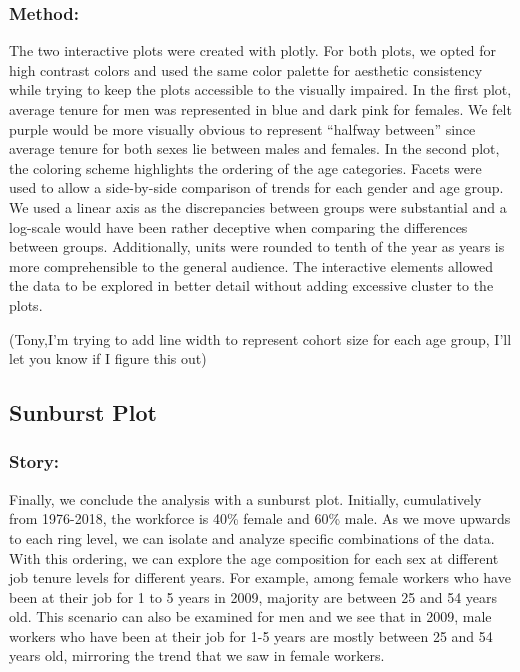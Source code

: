 \documentclass[]{article}
\begin{document}
\hypertarget{method-1}{%
\subsubsection{Method:}\label{method-1}}

The two interactive plots were created with plotly. For both plots, we
opted for high contrast colors and used the same color palette for
aesthetic consistency while trying to keep the plots accessible to the
visually impaired. In the first plot, average tenure for men was
represented in blue and dark pink for females. We felt purple would be
more visually obvious to represent ``halfway between'' since average
tenure for both sexes lie between males and females. In the second plot,
the coloring scheme highlights the ordering of the age categories.
Facets were used to allow a side-by-side comparison of trends for each
gender and age group. We used a linear axis as the discrepancies between
groups were substantial and a log-scale would have been rather deceptive
when comparing the differences between groups. Additionally, units were
rounded to tenth of the year as years is more comprehensible to the
general audience. The interactive elements allowed the data to be
explored in better detail without adding excessive cluster to the plots.

(Tony,I'm trying to add line width to represent cohort size for each age
group, I'll let you know if I figure this out)

\hypertarget{sunburst-plot}{%
\subsection{Sunburst Plot}\label{sunburst-plot}}

\hypertarget{story-2}{%
\subsubsection{Story:}\label{story-2}}

Finally, we conclude the analysis with a sunburst plot. Initially,
cumulatively from 1976-2018, the workforce is 40\% female and 60\% male.
As we move upwards to each ring level, we can isolate and analyze
specific combinations of the data. With this ordering, we can explore
the age composition for each sex at different job tenure levels for
different years. For example, among female workers who have been at
their job for 1 to 5 years in 2009, majority are between 25 and 54 years
old. This scenario can also be examined for men and we see that in 2009,
male workers who have been at their job for 1-5 years are mostly between
25 and 54 years old, mirroring the trend that we saw in female workers.
\end{document}
